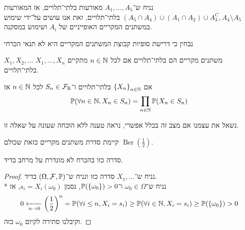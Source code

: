 \begin{example}
	נניח ש־$A_1, \dots, A_5$ מאורעות בלתי־תלויים, אז המאורעות $(A_5 \cap A_4) \cup (A_1 \cap A_2) \cup A_3^C, A_4 \setminus A_5$ בלתי־תלויים,
	זאת אנו עושים על־ידי שימוש במשתנים המקריים האופייניים של $A_i$ ושימוש במסקנה.
\end{example}
נבחין כי דרישת סופיות קבוצת המשתנים המקריים היא לא תנאי הכרחי
\begin{definition}
	$X_1, X_2, \dots$ משתנים מקריים הם בלתי־תלויים אם לכל $n \in \mathbb{N}$ מתקיים $X_1, \dots, X_n$ בלתי־תלויים.
\end{definition}
\begin{proposition}
	אם ${\{X_n\}}_{n \in \mathbb{N}}$ בלתי־תלויים ו־$S_n \in \mathcal{F}_{\mathbb{R}}$ לכל $n \in \mathbb{N}$ אז
	\[
		\mathbb{P}(\forall n \in \mathbb{N}, X_n \in S_n)
		= \prod_{n \in \mathbb{N}} \mathbb{P}(X_n \in S_n)
	\]
\end{proposition}
נשאל את עצמנו אם מצב זה בכלל אפשרי, נראה טענה ללא הוכחה שעונה על שאלה זו.
\begin{proposition}
	קיימת סדרת משתנים מקריים כזאת שכולם $\operatorname{Ber}(\frac{1}{2})$.
\end{proposition}
\begin{proposition}
	סדרה כזו בהכרח לא מוגדרת על מרחב בדיד.
\end{proposition}
\begin{proof}
	נניח ש־$X_1, \dots$ סדרה כזו ונניח ש־$(\Omega, \mathcal{F}, \mathbb{P})$ בדיד. \\*
	נניח ש־$\omega_0 \in \Omega$ ו־$\mathbb{P}(\{\omega_0\}) > 0$, נסמן $s_i = X_i(\omega_0)$, אז
	\[
		0 \xleftarrow[n \to 0]{} {\left(\frac{1}{2}\right)}^n = \mathbb{P}(\forall i \le n, X_i = s_i) \ge \mathbb{P}(\forall i \in \mathbb{N}, X_i = s_i) \ge \mathbb{P}(\{\omega_0\}) > 0
	\]
	וקיבלנו סתירה לקיום $\omega_0$ כזה.
\end{proof}

